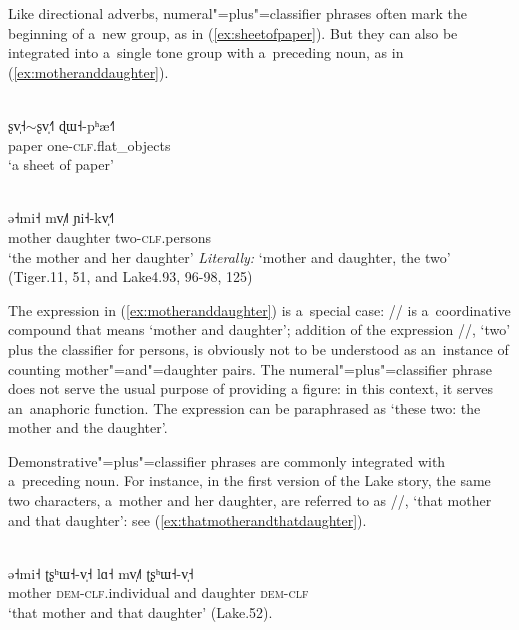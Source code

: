 Like directional adverbs, numeral"=plus"=classifier phrases often mark the beginning of a~new group, as in (\ref{ex:sheetofpaper}). But
they can also be integrated into a~single tone group with a~preceding noun, as in (\ref{ex:motheranddaughter}). 

\begin{exe}
	\ex
	\label{ex:sheetofpaper}
	\\
	\gll ʂv̩˧{$\sim$}ʂv̩˧˥	ɖɯ˧-pʰæ˧˥\\
	paper		one-\textsc{clf}.flat\_objects\\
	\glt ‘a sheet of paper’
\end{exe}

\begin{exe}
	\ex
	\label{ex:motheranddaughter}
	\\
	\gll ə˧mi˧	mv̩˩˥		ɲi˧-kv̩˧˥\\
	mother		daughter	two-\textsc{clf}.persons\\
	\glt  ‘the mother and her daughter’ \textit{Literally:} ‘mother and
		daughter, the two’ (Tiger.11, 51, and Lake4.93, 96-98, 125)
\end{exe}

The expression in (\ref{ex:motheranddaughter}) is a~special case: // is a~coordinative compound that means ‘mother and daughter’; addition of the expression //, ‘two’ plus the classifier for persons, is obviously not to be understood as an~instance of counting mother"=and"=daughter pairs. The numeral"=plus"=classifier
{\linebreak}phrase does not serve the usual purpose of providing a figure: in this
context, it serves an~anaphoric function. The expression can be paraphrased as ‘these two: the mother and the daughter’. 

Demonstrative"=plus"=classifier phrases are commonly integrated with a~preceding noun. For instance,
in the first version of the Lake story, the same two characters, a~mother and her daughter, are
referred to as //,
‘that mother and that daughter’: see (\ref{ex:thatmotherandthatdaughter}). 

\begin{exe}
  \ex
  \label{ex:thatmotherandthatdaughter}
  \\
  \gll ə˧mi˧ 	ʈʂʰɯ˧-v̩˧		lɑ˧	mv̩˩˥		ʈʂʰɯ˧-v̩˧\\
  mother 	\textsc{dem}-\textsc{clf}.individual	and	daughter	\textsc{dem}-\textsc{clf}\\
  \glt ‘that mother and that daughter’ (Lake.52).
\end{exe}


